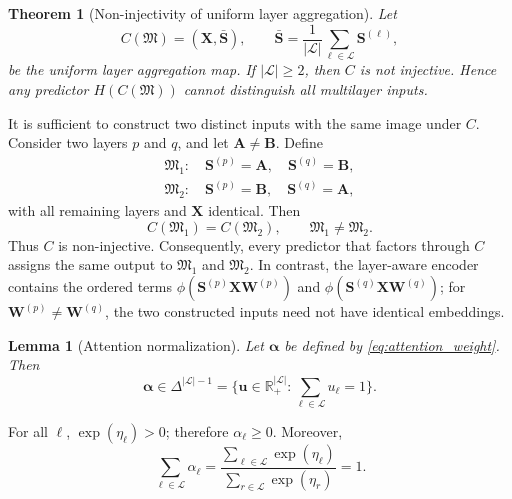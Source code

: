 \documentclass[journal]{IEEEtran}
\newtheorem{theorem}{Theorem}
\newtheorem{lemma}{Lemma}
\begin{document}
\begin{theorem}[Non-injectivity of uniform layer aggregation]
Let
\begin{equation}
    C(\mathfrak{M})
    =\left(\mathbf{X},
    \bar{\mathbf{S}}\right),\qquad
    \bar{\mathbf{S}}=\frac{1}{|\mathcal{L}|}
    \sum_{\ell\in\mathcal{L}}\mathbf{S}^{(\ell)},
\end{equation}
be the uniform layer aggregation map. If $|\mathcal{L}|\geq2$, then $C$ is not
injective. Hence any predictor $H(C(\mathfrak{M}))$ cannot distinguish all
multilayer inputs.
\end{theorem}
\begin{IEEEproof}
It is sufficient to construct two distinct inputs with the same image under
$C$. Consider two layers $p$ and $q$, and let $\mathbf{A}\neq\mathbf{B}$.
Define
\begin{equation}
\begin{array}{ll}
\mathfrak{M}_1:\quad
\mathbf{S}^{(p)}=\mathbf{A},\quad
\mathbf{S}^{(q)}=\mathbf{B},\\[2mm]
\mathfrak{M}_2:\quad
\mathbf{S}^{(p)}=\mathbf{B},\quad
\mathbf{S}^{(q)}=\mathbf{A},
\end{array}
\end{equation}
with all remaining layers and $\mathbf{X}$ identical. Then
\begin{equation}
    C(\mathfrak{M}_1)
    =C(\mathfrak{M}_2),
    \qquad
    \mathfrak{M}_1\neq\mathfrak{M}_2.
\end{equation}
Thus $C$ is non-injective. Consequently, every predictor
that factors through $C$ assigns the same output to
$\mathfrak{M}_1$ and $\mathfrak{M}_2$. In contrast, the layer-aware encoder
contains the ordered terms
$\phi(\mathbf{S}^{(p)}\mathbf{X}\mathbf{W}^{(p)})$ and
$\phi(\mathbf{S}^{(q)}\mathbf{X}\mathbf{W}^{(q)})$; for
$\mathbf{W}^{(p)}\neq\mathbf{W}^{(q)}$, the two constructed inputs need not
have identical embeddings.
\end{IEEEproof}

\begin{lemma}[Attention normalization]
Let $\boldsymbol{\alpha}$ be defined by \eqref{eq:attention_weight}. Then
\begin{equation}
    \boldsymbol{\alpha}\in\Delta^{|\mathcal{L}|-1}
    =\{\mathbf{u}\in\mathbb{R}_{+}^{|\mathcal{L}|}:
    \sum_{\ell\in\mathcal{L}}u_{\ell}=1\}.
\end{equation}
\end{lemma}
\begin{IEEEproof}
For all $\ell$, $\exp(\eta_{\ell})>0$; therefore $\alpha_{\ell}\geq0$.
Moreover,
\begin{equation}
    \sum_{\ell\in\mathcal{L}}\alpha_{\ell}
    =
    \frac{\sum_{\ell\in\mathcal{L}}\exp(\eta_{\ell})}
    {\sum_{r\in\mathcal{L}}\exp(\eta_r)}
    =1.
\end{equation}
\end{IEEEproof}
\end{document}
